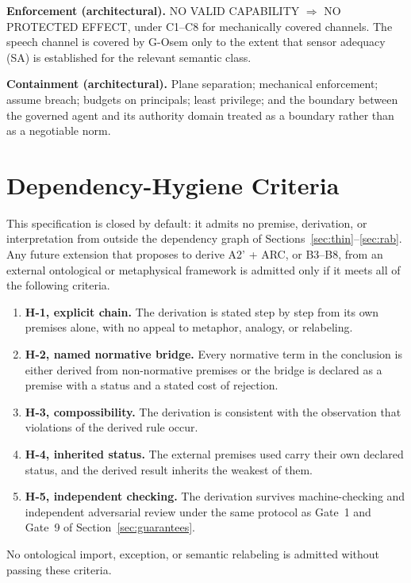 \documentclass[11pt]{article}
\def\ensuremath#1{#1}%
\def\mathrm#1{#1}%
\def\textsuperscript#1{#1}%
\newcommand{\Atwo}{\texorpdfstring{\ensuremath{\mathrm{A2}'}}{A2'}}
\newcommand{\Gsem}{G-O\textsuperscript{sem}}
\begin{document}
\textbf{Enforcement (architectural).} NO VALID CAPABILITY $\Rightarrow$ NO PROTECTED EFFECT, under C1--C8 for mechanically covered channels. The speech channel is covered by \Gsem{} only to the extent that sensor adequacy (SA) is established for the relevant semantic class.

\textbf{Containment (architectural).} Plane separation; mechanical enforcement; assume breach; budgets on principals; least privilege; and the boundary between the governed agent and its authority domain treated as a boundary rather than as a negotiable norm.

\section{Dependency-Hygiene Criteria}\label{app:routeo}
This specification is closed by default: it admits no premise, derivation, or interpretation from outside the dependency graph of Sections~\ref{sec:thin}--\ref{sec:rab}. Any future extension that proposes to derive \Atwo{} + ARC, or B3--B8, from an external ontological or metaphysical framework is admitted only if it meets all of the following criteria.
\begin{enumerate}
\item \textbf{H-1, explicit chain.} The derivation is stated step by step from its own premises alone, with no appeal to metaphor, analogy, or relabeling.
\item \textbf{H-2, named normative bridge.} Every normative term in the conclusion is either derived from non-normative premises or the bridge is declared as a premise with a status and a stated cost of rejection.
\item \textbf{H-3, compossibility.} The derivation is consistent with the observation that violations of the derived rule occur.
\item \textbf{H-4, inherited status.} The external premises used carry their own declared status, and the derived result inherits the weakest of them.
\item \textbf{H-5, independent checking.} The derivation survives machine-checking and independent adversarial review under the same protocol as Gate~1 and Gate~9 of Section~\ref{sec:guarantees}.
\end{enumerate}
No ontological import, exception, or semantic relabeling is admitted without passing these criteria.
\end{document}
